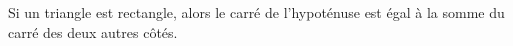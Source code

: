 Si un triangle est rectangle, alors le carré de l'hypoténuse est égal à la somme
du carré des deux autres côtés.